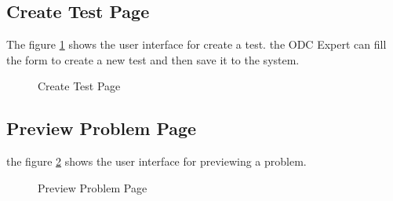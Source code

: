 \subsection{Create Test Page}
The figure \ref{Create Test Page} shows the user interface for create a test.
the ODC Expert can fill the form to create a new test and then save it to the system.

\begin{figure}
  \centering
  \setlength\fboxsep{0pt} %
  \setlength\fboxrule{2pt} %
  \caption{Create Test Page}\label{Create Test Page}
\end{figure}

\subsection{Preview Problem Page}
the figure \ref{Preview Problem Page} shows the user interface for previewing a problem.

\begin{figure}
  \centering
  \setlength\fboxsep{0pt} %
  \setlength\fboxrule{2pt} %
  \caption{Preview Problem Page}\label{Preview Problem Page}
\end{figure}

